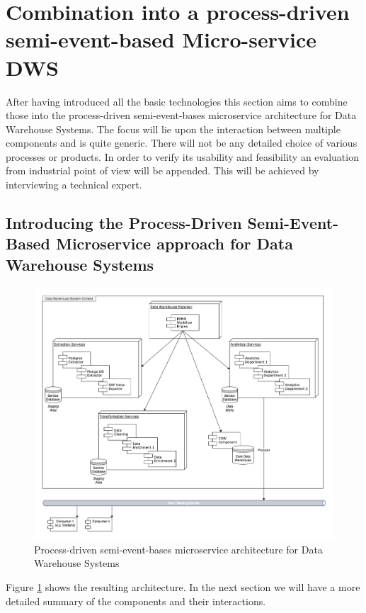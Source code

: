 \section{Combination into a process-driven semi-event-based Micro-service DWS}
\label{sec:finalArchitecture}
After having introduced all the basic technologies this section aims to combine those into the process-driven semi-event-bases microservice architecture for Data Warehouse Systems. The focus will lie upon the interaction between multiple components and is quite generic. There will not be any detailed choice of various processes or products. In order to verify its usability and feasibility an evaluation from industrial point of view will be appended. This will be achieved by interviewing a technical expert.

\subsection{Introducing the Process-Driven Semi-Event-Based Microservice approach for Data Warehouse Systems}
\begin{figure}[!htb]
    \centering
    \includegraphics[scale=0.43]{pictures/ResultingArchitecture.png}
    \caption{Process-driven semi-event-bases microservice architecture for Data Warehouse Systems}
    \label{fig:resultingArch}
\end{figure}
Figure \ref{fig:resultingArch} shows the resulting architecture. In the next section we will have a more detailed summary of the components and their interactions.\newline
